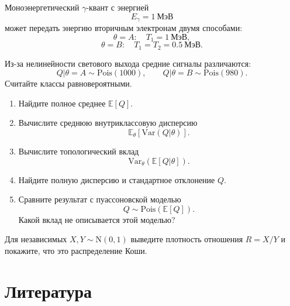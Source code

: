 \documentclass[
  russian,
  11pt,
  a4paper,
  open=any]{scrbook}
\providecommand{\tightlist}{%
  \setlength{\itemsep}{0pt}\setlength{\parskip}{0pt}}
\begin{document}
\begin{semanticpdfbox}[colback=BookCoralSoft,borderline west={1.2mm}{0pt}{BookCoral}]

\par\nopagebreak[4]\vspace{1.2mm}

Моноэнергетический \(\gamma\)-квант с энергией \[
E_\gamma=1\ \text{МэВ}
\] может передать энергию вторичным электронам двумя способами: \[
\theta=A:\quad T_1=1\ \text{МэВ},
\] \[
\theta=B:\quad T_1=T_2=0.5\ \text{МэВ}.
\]

Из-за нелинейности светового выхода средние сигналы различаются: \[
Q|\theta=A\sim\mathrm{Pois}(1000),
\qquad
Q|\theta=B\sim\mathrm{Pois}(980).
\] Считайте классы равновероятными.

\begin{enumerate}
\def\labelenumi{\arabic{enumi}.}
\tightlist
\item
  Найдите полное среднее \(\mathbb E[Q]\).
\item
  Вычислите среднюю внутриклассовую дисперсию \[
  \mathbb E_\theta[\mathrm{Var}(Q|\theta)].
  \]
\item
  Вычислите топологический вклад \[
  \mathrm{Var}_\theta(\mathbb E[Q|\theta]).
  \]
\item
  Найдите полную дисперсию и стандартное отклонение \(Q\).
\item
  Сравните результат с пуассоновской моделью \[
  Q\sim\mathrm{Pois}(\mathbb E[Q]).
  \] Какой вклад не описывается этой моделью?
\end{enumerate}

\end{semanticpdfbox}

\begin{semanticpdfbox}[colback=BookCoralSoft,borderline west={1.2mm}{0pt}{BookCoral}]

\par\nopagebreak[4]\vspace{1.2mm}

Для независимых \(X,Y\sim\mathrm{N}(0,1)\) выведите плотность отношения
\(R=X/Y\) и покажите, что это распределение Коши.

\end{semanticpdfbox}

\section*{Литература}\label{ux43bux438ux442ux435ux440ux430ux442ux443ux440ux430-4}
\end{document}
